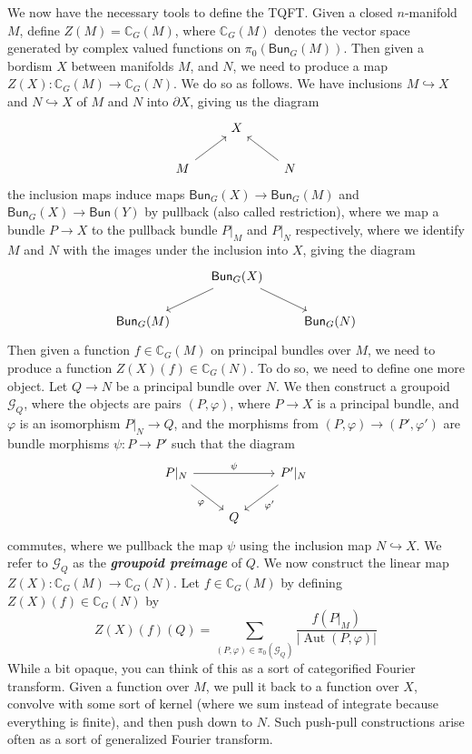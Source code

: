 \documentclass[psamsfonts, 11pt]{amsart}
\theoremstyle{definition}
\theoremstyle{remark}
\newcommand{\ib}[1]{\textbf{\textit{#1}}}
\newcommand{\C}{\mathbb{C}}
\newcommand{\Bun}{\mathsf{Bun}}
\DeclareMathOperator{\Aut}{Aut}
\begin{document}
We now have the necessary tools to define the TQFT. Given a closed $n$-manifold $M$,
define $Z(M) = \C_G(M)$, where $\C_G(M)$ denotes the vector space generated by complex
valued functions on $\pi_0(\Bun_G(M))$. Then given a bordism $X$
between manifolds $M$, and $N$, we need to produce a map $Z(X) : \C_G(M) \to \C_G(N)$.
We do so as follows. We have inclusions $M \hookrightarrow X$ and $N \hookrightarrow X$
of $M$ and $N$ into $\partial X$, giving us the diagram
\[\begin{tikzcd}
& X \\
M\ar[ur] && N\ar[ul]
\end{tikzcd}\]
the inclusion maps induce maps $\Bun_G(X) \to \Bun_G(M)$ and $\Bun_G(X)\to \Bun(Y)$
by pullback (also called restriction), where we map a bundle $P \to X$ to the
pullback bundle $P\vert_M$ and $P\vert_N$ respectively, where we identify $M$
and $N$ with the images under the inclusion into $X$, giving the diagram
\[\begin{tikzcd}
& \Bun_G(X) \ar[dl]\ar[dr] \\
\Bun_G(M) && \Bun_G(N)
\end{tikzcd}\]
Then given a function $f \in \C_G(M)$ on principal bundles over $M$, we need to
produce a function $Z(X)(f) \in \C_G(N)$. To do so, we need to define one more
object. Let $Q \to N$ be a principal bundle over $N$. We then construct a
groupoid $\mathcal{G}_Q$, where the objects are pairs $(P, \varphi)$, where
$P \to X$ is a principal bundle, and $\varphi$ is an isomorphism $P\vert_N \to Q$,
and the morphisms from $(P, \varphi) \to (P', \varphi')$ are bundle morphisms
$\psi : P \to P'$ such that the diagram
\[\begin{tikzcd}
P\vert_N \ar[dr, "\varphi"']\ar[rr, "\psi"] && P'\vert_N \ar[dl, "\varphi'"]\\
& Q
\end{tikzcd}\]
commutes, where we pullback the map $\psi$ using the inclusion map $N \hookrightarrow X$.
We refer to $\mathcal{G}_Q$ as the \ib{groupoid preimage} of $Q$. We now construct the
linear map $Z(X) : \C_G(M) \to \C_G(N)$. Let $f \in \C_G(M)$ by defining
$Z(X)(f) \in \C_G(N)$ by
\[
Z(X)(f)(Q) = \sum_{(P,\varphi) \in \pi_0(\mathcal{G}_Q)}
\frac{f(P\vert_M)}{|\Aut(P,\varphi)|}
\]
While a bit opaque, you can think of this as a sort of categorified Fourier transform.
Given a function over $M$, we pull it back to a function over $X$, convolve with
some sort of kernel (where we sum instead of integrate because everything is finite), and
then push down to $N$. Such push-pull constructions arise often as a sort of generalized
Fourier transform.
%
\end{document}
